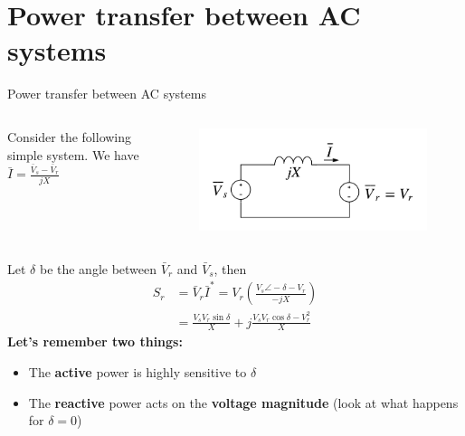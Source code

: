 \section{Power transfer between AC systems}
\begin{frame}[allowframebreaks]{Power transfer between AC systems}
    \begin{columns}
        \begin{column}{0.5\textwidth}
            Consider the following simple system. We have $\bar{I} = \frac{\bar{V}_s-\bar{V}_r}{jX}$
        \end{column}
        \begin{column}{0.5\textwidth}
            \begin{figure}
                \centering
                \includegraphics[width=\textwidth]{images/power-transfer_AC.png}
            \end{figure}
        \end{column}
    \end{columns}
    Let $\delta$ be the angle between $\bar{V}_r$ and $\bar{V}_s$, then
    $$
    \begin{aligned}
    S_r &= \bar{V}_r\bar{I}^* = V_r \left(\frac{V_s \angle -\delta - V_r}{-jX}\right) \\
         &= \frac{V_s V_r \sin \delta }{X} +j \frac{V_s V_r \cos \delta - V^2_r}{X}
    \end{aligned}
    $$
    \textbf{Let's remember two things:}
    \begin{itemize}
        \item The \textbf{active} power is highly sensitive to \textbf{$\delta$}
        \item The \textbf{reactive} power acts on the \textbf{voltage magnitude} (look at what happens for $\delta=0$)
    \end{itemize}

\end{frame}


